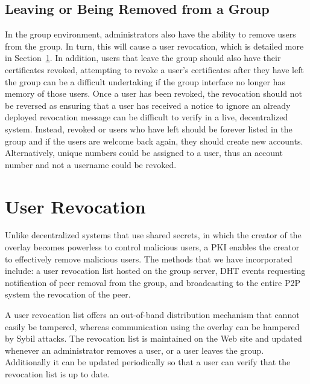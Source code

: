 \subsection{Leaving or Being Removed from a Group}
In the group environment, administrators also have the ability to remove users
from the group.  In turn, this will cause a user revocation, which is detailed
more in Section~\ref{revocation}.  In addition, users that leave the group
should also have their certificates revoked, attempting to revoke a user's
certificates after they have left the group can be a difficult undertaking
if the group interface no longer has memory of those users.  Once a user has
been revoked, the revocation should not be reversed as ensuring that a user
has received a notice to ignore an already deployed revocation message can be
difficult to verify in a live, decentralized  system.  Instead, revoked or
users who have left should be forever listed in the group and if the users are
welcome back again, they should create new accounts.  Alternatively, unique
numbers could be assigned to a user, thus an account number and not a username
could be revoked.

\section{User Revocation}
\label{revocation}
Unlike decentralized systems that use shared secrets, in which the creator of
the overlay becomes powerless to control malicious users, a PKI enables the
creator to effectively remove malicious users.  The methods that we have
incorporated include:  a user revocation list hosted on the group server,
DHT events requesting notification of peer removal from the group, and
broadcasting to the entire P2P system the revocation of the peer.

A user revocation list offers an out-of-band distribution mechanism that cannot
easily be tampered, whereas communication using the overlay can be hampered
by Sybil attacks.  The revocation list is maintained on the Web site and updated
whenever an administrator removes a user, or a user leaves the group.
Additionally it can be updated periodically so that a user can verify that the
revocation list is up to date.

